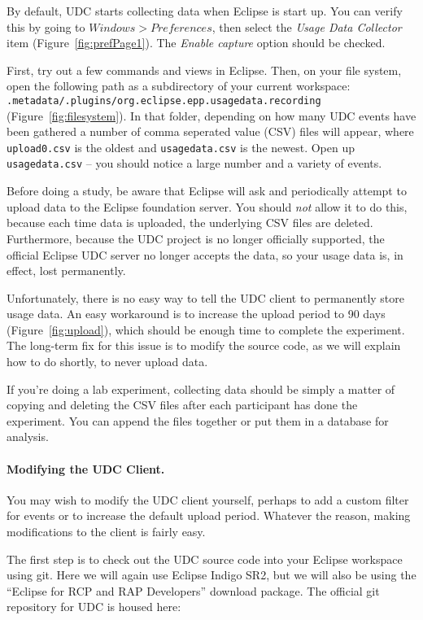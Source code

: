 By default, UDC starts collecting data when Eclipse is start up. 
You can verify this by going to $Windows > Preferences$, then 
select the \textit{Usage Data Collector} item (Figure~\ref{fig:prefPage1}).
The \textit{Enable capture} option should be checked.

First, try out a few commands and views in Eclipse.
Then, on your file system, open the following path as a subdirectory
of your current workspace: \texttt{.metadata/.plugins/org.eclipse.epp.usagedata.recording}
(Figure~\ref{fig:filesystem}).
In that folder, depending on how many UDC events have been gathered 
a number of comma seperated value (CSV) files will appear, where \texttt{upload0.csv} is the oldest
and \texttt{usagedata.csv} is the newest.
Open up \texttt{usagedata.csv} -- you should notice a large number and a variety of events.

Before doing a study, be aware that Eclipse will ask and periodically attempt to upload
data to the Eclipse foundation server.
You should \emph{not} allow it to do this, because each time data is uploaded, the underlying
CSV files are deleted.
Furthermore, because the UDC project is no longer officially supported, the official Eclipse
UDC server no longer accepts the data, so your usage data is, in effect, lost permanently.

Unfortunately, there is no easy way to tell the UDC client to permanently store
usage data.
An easy workaround is to increase the upload period to 90 days (Figure~\ref{fig:upload}),
which should be enough time to complete the experiment.
The long-term fix for this issue is to modify the source code, as we will explain
how to do shortly, to never upload data.

If you're doing a lab experiment, collecting data should be simply a matter of 
copying and deleting the CSV files after each participant has done the experiment.
You can append the files together or put them in a database for analysis.

\paragraph{Modifying the UDC Client.}


You may wish to modify the UDC client yourself, perhaps to add a custom filter for events
or to increase the default upload period.
Whatever the reason, making modifications to the client is fairly easy.

The first step is to check out the UDC source code into your Eclipse
workspace using git.
Here we will again use Eclipse Indigo SR2, but we will also be using the 
``Eclipse for RCP and RAP Developers'' download package.
The official git repository for UDC is housed here:

